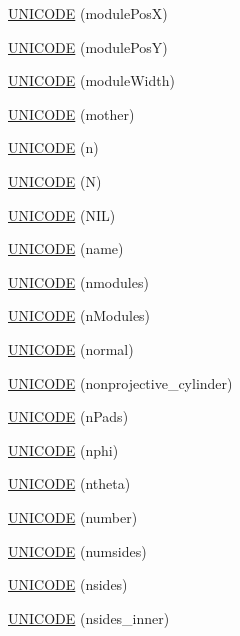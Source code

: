\begin{DoxyCompactItemize}
\item 
\hyperlink{namespace_d_d4hep_1_1_x_m_l_a30c3d2ead1a959de5e1e655caf18dd5b}{UNICODE} (modulePosX)
\item 
\hyperlink{namespace_d_d4hep_1_1_x_m_l_a26ea3c02013856eaad65b0411cea2786}{UNICODE} (modulePosY)
\item 
\hyperlink{namespace_d_d4hep_1_1_x_m_l_a9afd0c09663cbee7f1e3b11a402453f6}{UNICODE} (moduleWidth)
\item 
\hyperlink{namespace_d_d4hep_1_1_x_m_l_a4c8903519e286213795023f3710c57a5}{UNICODE} (mother)
\item 
\hyperlink{namespace_d_d4hep_1_1_x_m_l_a3458a4001edb8639d60f56e9433ff533}{UNICODE} (n)
\item 
\hyperlink{namespace_d_d4hep_1_1_x_m_l_a39395e66100bbe3d31d68c6d9cabd9e7}{UNICODE} (N)
\item 
\hyperlink{namespace_d_d4hep_1_1_x_m_l_ad11ed89baa27e8b010b7b5ffc43fa7be}{UNICODE} (NIL)
\item 
\hyperlink{namespace_d_d4hep_1_1_x_m_l_ad5f515f8aede0de68a6c803b44c5fcbf}{UNICODE} (name)
\item 
\hyperlink{namespace_d_d4hep_1_1_x_m_l_aaaf759b178c00e1bb07c4aaaaa1b0c33}{UNICODE} (nmodules)
\item 
\hyperlink{namespace_d_d4hep_1_1_x_m_l_a491f8e607ec89dbfc461cf4cb468d506}{UNICODE} (nModules)
\item 
\hyperlink{namespace_d_d4hep_1_1_x_m_l_a1001c7931f28d25f8c5e9028d57d7947}{UNICODE} (normal)
\item 
\hyperlink{namespace_d_d4hep_1_1_x_m_l_aafb4b59f013f6ec65c2d6245c1a27eb6}{UNICODE} (nonprojective\_\-cylinder)
\item 
\hyperlink{namespace_d_d4hep_1_1_x_m_l_a1dc4956b679a83bac03a0ce23e65652d}{UNICODE} (nPads)
\item 
\hyperlink{namespace_d_d4hep_1_1_x_m_l_ab95167cdaa5e343a440636b77d02768d}{UNICODE} (nphi)
\item 
\hyperlink{namespace_d_d4hep_1_1_x_m_l_ab79f1b31012180a9fc1c35731915b35a}{UNICODE} (ntheta)
\item 
\hyperlink{namespace_d_d4hep_1_1_x_m_l_ad0b76e024c44947a4c3d0e9fcc9aa9c5}{UNICODE} (number)
\item 
\hyperlink{namespace_d_d4hep_1_1_x_m_l_a20f83649d0983872196ab2475768bbd4}{UNICODE} (numsides)
\item 
\hyperlink{namespace_d_d4hep_1_1_x_m_l_a60c34fa10c725e4ea4347368491dd580}{UNICODE} (nsides)
\item 
\hyperlink{namespace_d_d4hep_1_1_x_m_l_acab9f079b53b9049aaca67f8f12676c8}{UNICODE} (nsides\_\-inner)

\end{DoxyCompactItemize}
